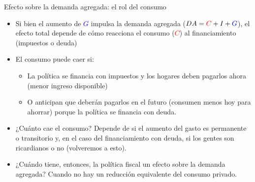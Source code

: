 \documentclass{beamer}
\begin{document}
\begin{frame}{Efecto sobre la demanda agregada: el rol del consumo}
    \begin{itemize}
        \item Si bien el aumento de \textcolor{blue}{$G$} impulsa la demanda agregada ($DA= \textcolor{red}{C}+ I+ \textcolor{blue}{G}$), el efecto total depende de cómo reacciona el consumo (\textcolor{red}{$C$}) al financiamiento (impuestos o deuda)
        \item El consumo puede caer si:
        \begin{itemize}
            \item La política se financia con impuestos y los hogares deben pagarlos ahora (menor ingreso disponible)
            \item O anticipan que deberán pagarlos en el futuro (consumen menos hoy para ahorrar) porque la política se financia con deuda. 
        \end{itemize}
        \item ¿Cuánto cae el consumo? Depende de si el aumento del gasto es permanente o transitorio y, en el caso del financiamiento con deuda, si los gentes son ricardianos o no (volveremos a esto).
        \item ¿Cuándo tiene, entonces, la política fiscal un efecto sobre la demanda agregada? Cuando no hay un reducción equivalente del consumo privado. 
    \end{itemize}
\end{frame}
\end{document}
